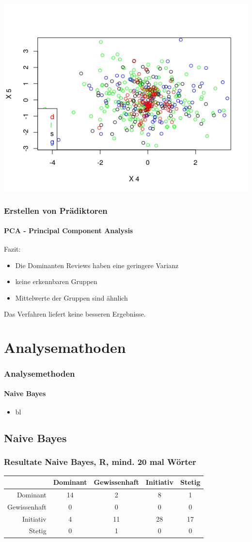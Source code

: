 \documentclass{beamer}
\begin{document}
\begin{frame}
 \includegraphics[scale=0.36]{PCA_4_5.png}
 
\end{frame}

\begin{frame}
 \frametitle{Erstellen von Prädiktoren}
 \framesubtitle{PCA - Principal Component Analysis}
 Fazit:
 \begin{itemize}
  \item Die Dominanten Reviews haben eine geringere Varianz
  \item keine erkennbaren Gruppen
  \item Mittelwerte der Gruppen sind ähnlich
 \end{itemize}
 
 Das Verfahren liefert keine besseren Ergebnisse. 

\end{frame}



\section{Analysemathoden}
\begin{frame}
\frametitle{Analysemethoden}
\framesubtitle{Naive Bayes}
\begin{itemize}\itemsep12pt
\item bl
\end{itemize}
\end{frame}

\subsection{Naive Bayes}
\begin{frame}
\frametitle{Resultate Naive Bayes, R, mind. 20 mal Wörter}
\begin{tabular}{r|c|c|c|c|}
 &  Dominant  & Gewissenhaft & Initiativ & Stetig\\
\hline
Dominant & 14 & 2 & 8 & 1 \\
Gewissenhaft & 0 & 0 & 0 & 0\\
Initiativ & 4 & 11 & 28 & 17\\
Stetig & 0 & 1 & 0 & 0
\end{tabular}
\end{frame}
\end{document}
